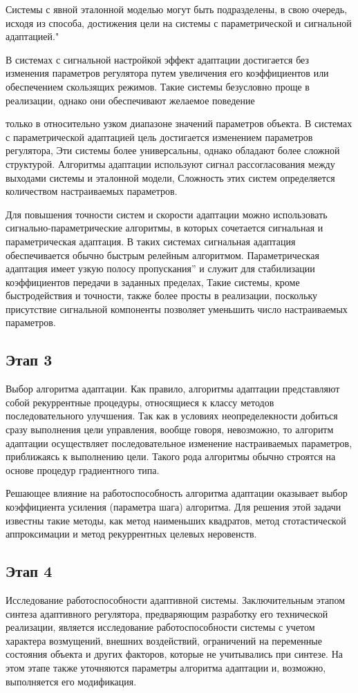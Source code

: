 \documentclass[a4paper,14pt]{extarticle} %
\begin{document}
Системы с явной эталонной моделью могут быть подразделены, в свою очередь, исходя из способа, достижения цели на системы с параметрической и сигнальной адаптацией."

В системах с сигнальной настройкой эффект адаптации достигается без изменения параметров регулятора путем увеличения его коэффициентов или обеспечением скользящих
режимов. Такие системы безусловно проще в реализации, однако они обеспечивают желаемое поведение

только в относительно узком диапазоне значений параметров объекта.
В системах с параметрической адаптацией цель достигается изменением параметров регулятора, Эти системы более универсальны, однако обладают более сложной структурой.
Алгоритмы адаптации используют сигнал рассогласования между выходами системы и эталонной модели, Сложность этих систем определяется количеством настраиваемых параметров.

Для повышения точности систем и скорости адаптации можно использовать сигнально-параметрические алгоритмы, в которых сочетается сигнальная и параметрическая адаптация. В таких системах сигнальная адаптация обеспечивается обычно быстрым релейным алгоритмом. Параметрическая адаптация имеет узкую полосу пропускания” и служит для
стабилизации коэффициентов передачи в заданных пределах,
Такие системы, кроме быстродействия и точности, также более просты в реализации, поскольку присутствие сигнальной компоненты позволяет уменьшить число настраиваемых параметров.

\subsection{Этап 3} Выбор алгоритма адаптации. Как правило, алгоритмы адаптации представляют собой рекуррентные процедуры, относящиеся к классу методов последовательного улучшения. Так как в условиях неопределекности добиться сразу выполнения цели управления, вообще говоря, невозможно, то алгоритм адаптации осуществляет последовательное изменение настраиваемых параметров, приближаясь к выполнению цели. Такого рода алгоритмы обычно строятся на основе процедур градиентного типа.

Решающее влияние на работоспособность алгоритма адаптации оказывает выбор коэффициента усиления (параметра шага) алгоритма. Для решения этой задачи известны такие методы, как метод наименьших квадратов, метод стотастической аппроксимации и метод рекуррентных целевых неровенств.

\subsection{Этап 4}
Исследование работоспособности адаптивной системы. Заключительным этапом синтеза адаптивного регулятора, предваряющим разработку его технической реализации, является исследование работоспособности системы с учетом характера возмущений, внешних воздействий, ограничений на переменные состояния объекта и других факторов, которые не учитывались при синтезе. На этом этапе также уточняются параметры алгоритма адаптации и, возможно, выполняется его модификация.
\end{document}
